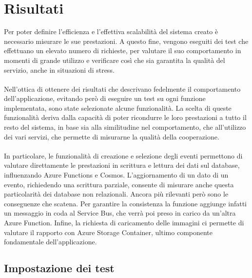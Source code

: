\chapter{Risultati}
Per poter definire l'efficienza e l'effettiva scalabilità del sistema creato 
è necessario misurare le sue prestazioni. 
A questo fine, vengono eseguiti dei test che effettuano un elevato numero di richieste,
per valutare il suo comportamento in momenti di grande utilizzo e
verificare così che sia garantita la qualità del servizio, anche in situazioni di stress.\\
\\
Nell'ottica di ottenere dei risultati che descrivano fedelmente 
il comportamento dell'applicazione, 
evitando però di eseguire un test su ogni funzione implementata,
sono state selezionate alcune funzionalità.
La scelta di queste funzionalità deriva dalla capacità 
di poter ricondurre le loro prestazioni a tutto il resto del sistema,
in base sia alla similitudine nel comportamento,
che all'utilizzo dei vari servizi, che permette di misurarne la qualità della cooperazione.\\
\\
In particolare, le funzionalità di creazione e selezione degli eventi permettono 
di valutare direttamente le prestazioni in scrittura e lettura dei dati sul database, 
influenzando Azure Functions e Cosmos.
L'aggiornamento di un dato di un evento,
richiedendo una scrittura parziale, 
consente di misurare anche questa particolarità dei database non relazionali.
Ancora più rilevanti però sono le conseguenze che scatena.
Per garantire la consistenza la funzione aggiunge infatti un messaggio in coda al Service Bus,
che verrà poi preso in carico da un'altra Azure Function.
Infine, la richiesta di caricamento delle immagini ci permette 
di valutare il rapporto con Azure Storage Container, 
ultimo componente fondamentale dell'applicazione.
\clearpage
\section{Impostazione dei test}

